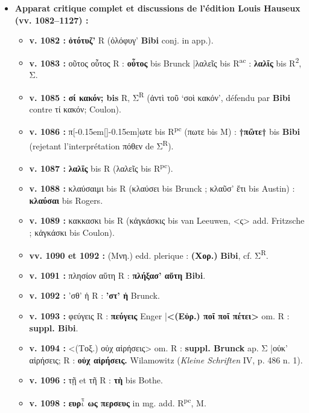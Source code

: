 \documentclass[10pt, a4paper, twoside]{book}
\renewcommand{\_}{\origunderscore\penalty0\relax}
\renewcommand{\texttt}[1]{#1}
\providecommand{\italique}[1]{\emph{#1}}
\providecommand{\lecon}[1]{\textbf{#1}}
\providecommand{\expo}[1]{\textsuperscript{#1}}
\providecommand{\Rac}{R\expo{ac}}
\providecommand{\Rpc}{R\expo{pc}}
\providecommand{\Rdeux}{R\expo{2}}
\providecommand{\Mon}{M}
\providecommand{\espApp}{\hspace{0.5em}|\hspace{0.5em}}
\providecommand{\inRas}[2]{[\kern-0.15em[\text{#1}]\kern-0.15em]\text{#2}}
\providecommand{\auDessus}[2]{\ensuremath{\overset{\text{#2}}{\text{#1}}}}
\begin{document}
\begin{itemize}
\begin{itemize}
    \item \textbf{Prothèse de σ au v. 1114 :} R écrit \lecon{σκύτο} pour \lecon{κύστο} (Scaliger, = κύσθον en prononciation scythe), parallèle exact invoqué par Louis Hauseux pour sa conjecture τὸν κύσθον au v. 557.
  \end{itemize}
  \item \textbf{Apparat critique complet et discussions de l'édition Louis Hauseux (\texttt{vv. 1082–1127}) :}
  \begin{itemize}
    \item \textbf{v. 1082 :} \lecon{ὀτότυζ'} R (ὀλόφυγ' \lecon{Bibi} conj. in app.).
    \item \textbf{v. 1083 :} οῦτος οὗτος R : \lecon{οὖτος} bis Brunck \espApp λαλεῖς bis \Rac{} : \lecon{λαλῖς} bis \Rdeux{}, Σ.
    \item \textbf{v. 1085 :} \textbf{σί κακόν; bis} R, Σ\textsuperscript{R} (ἀντὶ τοῦ `σοὶ κακόν', défendu par \lecon{Bibi} contre τί κακόν; Coulon).
    \item \textbf{v. 1086 :} π\inRas{ρ}{}ωτε bis \Rpc{} (πωτε bis \Mon{}) : \lecon{†πῶτε†} bis \lecon{Bibi} (rejetant l'interprétation πόθεν de Σ\textsuperscript{R}).
    \item \textbf{v. 1087 :} \lecon{λαλῖς} bis R (λαλεῖς bis \Rpc{}).
    \item \textbf{v. 1088 :} κλαύσαιμι bis R (κλαύσει bis Brunck ; κλαῦσ' ἔτι bis Austin) : \lecon{κλαύσαι} bis Rogers.
    \item \textbf{v. 1089 :} κακκασκι bis R (κἀγκάσκις bis van Leeuwen, <ς> add. Fritzsche ; κἀγκάσκι bis Coulon).
    \item \textbf{vv. 1090 et 1092 :} (Μνη.) edd. plerique : \lecon{(Χορ.)} \lecon{Bibi}, cf. Σ\textsuperscript{R}.
    \item \textbf{v. 1091 :} πλησίον αὕτη R : \lecon{πλήξασ' αὕτη} \lecon{Bibi}.
    \item \textbf{v. 1092 :} 'σθ' ἡ R : \lecon{'στ' ἠ} Brunck.
    \item \textbf{v. 1093 :} φεύγεις R : \lecon{πεύγεις} Enger \espApp \lecon{<(Εὐρ.) ποῖ ποῖ πέτει>} om. R : \textbf{suppl. Bibi}.
    \item \textbf{v. 1094 :} <(Τοξ.) οὐχ αἱρήσεις> om. R : \textbf{suppl. Brunck} ap. Σ \espApp οὐκ' αἰρήσεις; R : \lecon{οὐχ αἱρήσεις.} Wilamowitz (\italique{Kleine Schriften} IV, p. 486 n. 1).
    \item \textbf{v. 1096 :} τῇ et τῆ R : \lecon{τὴ} bis Bothe.
    \item \textbf{v. 1098 :} \lecon{ευρ\auDessus{ι}{π} ως περσευς} in mg. add. \Rpc{}, \Mon{}.

\end{itemize}
\end{itemize}
\end{document}
